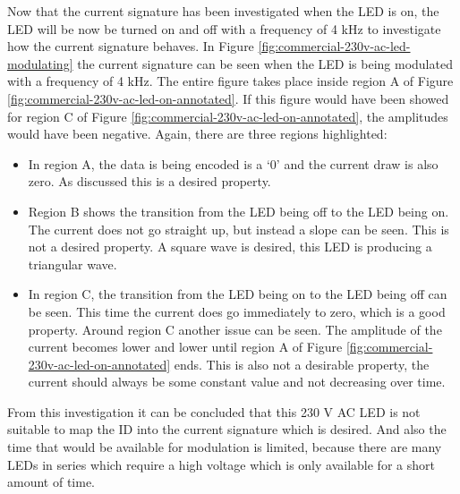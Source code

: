 Now that the current signature has been investigated when the LED is on, the LED will be now be turned on and off with a frequency of 4 kHz to investigate how the current signature behaves.
In Figure \ref{fig:commercial-230v-ac-led-modulating} the current signature can be seen when the LED is being modulated with a frequency of 4 kHz.
The entire figure takes place inside region A of Figure \ref{fig:commercial-230v-ac-led-on-annotated}.
If this figure would have been showed for region C of Figure \ref{fig:commercial-230v-ac-led-on-annotated}, the amplitudes would have been negative.
Again, there are three regions highlighted:

\begin{itemize}

	\item In region A, the data is being encoded is a `0' and the current draw is also zero.
	As discussed this is a desired property.

	\item Region B shows the transition from the LED being off to the LED being on.
	The current does not go straight up, but instead a slope can be seen.
	This is not a desired property.
	A square wave is desired, this LED is producing a triangular wave.

	\item In region C, the transition from the LED being on to the LED being off can be seen.
	This time the current does go immediately to zero, which is a good property.
	Around region C another issue can be seen. 
	The amplitude of the current becomes lower and lower until region A of Figure \ref{fig:commercial-230v-ac-led-on-annotated} ends.
	This is also not a desirable property, the current should always be some constant value and not decreasing over time.

\end{itemize} 



From this investigation it can be concluded that this 230 V AC LED is not suitable to map the ID into the current signature which is desired.
And also the time that would be available for modulation is limited, because there are many LEDs in series which require a high voltage which is only available for a short amount of time.








